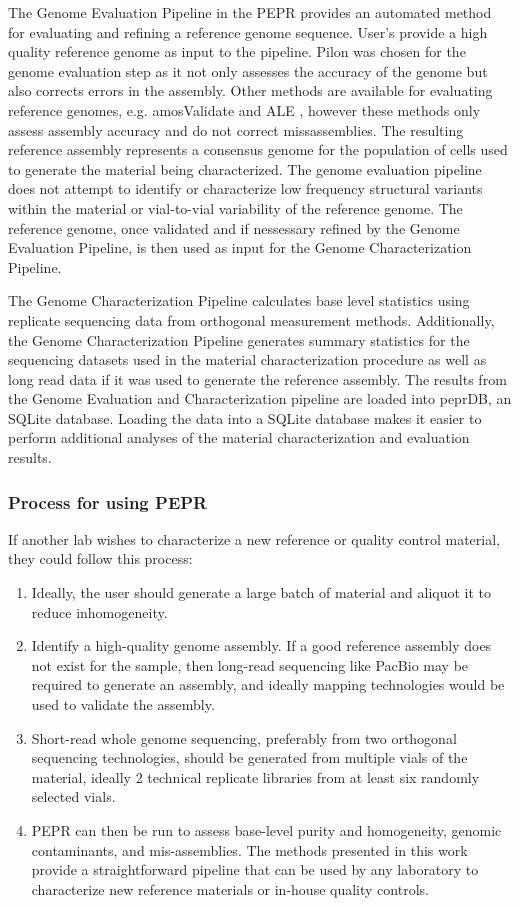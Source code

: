 \documentclass[smallextended]{svjour3}\usepackage[]{graphicx}\usepackage[]{color}
\begin{document}
The Genome Evaluation Pipeline in the PEPR provides an automated method for evaluating and refining a reference genome sequence. User's provide a high quality reference genome as input to the pipeline. Pilon was chosen for the genome evaluation step as it not only assesses the accuracy of the genome but also corrects errors in the assembly.  Other methods are available for evaluating reference genomes, e.g. amosValidate \cite{Phillippy2008} and ALE \cite{Clark2013}, however these methods only assess assembly accuracy and do not correct missassemblies. The resulting reference assembly represents a consensus genome for the population of cells used to generate the material being characterized.  The genome evaluation pipeline does not attempt to identify or characterize low frequency structural variants within the material or vial-to-vial variability of the reference genome. The reference genome, once validated and if nessessary refined by the Genome Evaluation Pipeline, is then used as input for the Genome Characterization Pipeline. 

The Genome Characterization Pipeline calculates base level statistics using replicate sequencing data from orthogonal measurement methods.  Additionally, the Genome Characterization Pipeline generates summary statistics for the sequencing datasets used in the material characterization procedure as well as long read data if it was used to generate the reference assembly.  The results from the Genome Evaluation and Characterization pipeline are loaded into peprDB, an SQLite database. Loading the data into a SQLite database makes it easier to perform additional analyses of the material characterization and evaluation results.

\subsubsection{Process for using PEPR}
If another lab wishes to characterize a new reference or quality control material, they could follow this process:
\begin{enumerate}
    \item Ideally, the user should generate a large batch of material and aliquot it to reduce inhomogeneity.
    \item Identify a high-quality genome assembly. If a good reference assembly does not exist for the sample, then long-read sequencing like PacBio may be required to generate an assembly, and ideally mapping technologies would be used to validate the assembly.
    \item Short-read whole genome sequencing, preferably from two orthogonal sequencing technologies, should be generated from multiple vials of the material, ideally 2 technical replicate libraries from at least six randomly selected vials.
    \item PEPR can then be run to assess base-level purity and homogeneity, genomic contaminants, and mis-assemblies.
The methods presented in this work provide a straightforward pipeline that can be used by any laboratory to characterize new reference materials or in-house quality controls.
\end{enumerate}
\end{document}
